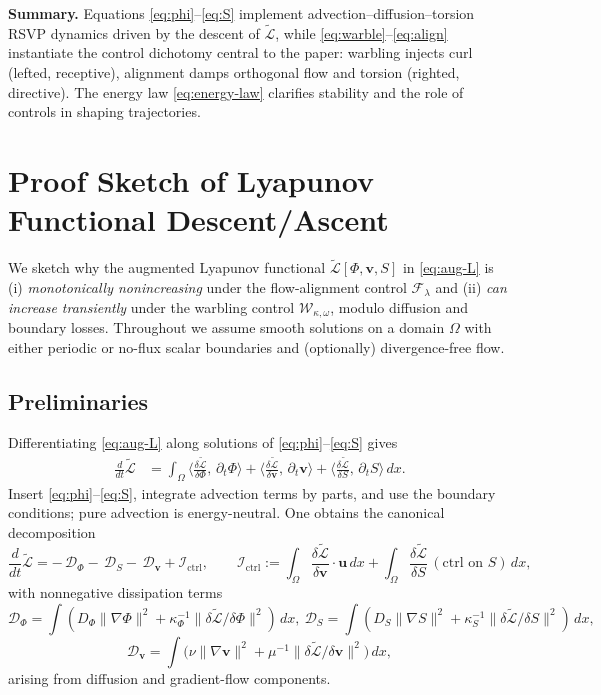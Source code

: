 \documentclass[a4paper,11pt]{article}
\begin{document}
\bigskip
\noindent
\textbf{Summary.} Equations \eqref{eq:phi}–\eqref{eq:S} implement
advection–diffusion–torsion RSVP dynamics driven by the descent of
\(\widetilde{\mathcal{L}}\), while \eqref{eq:warble}–\eqref{eq:align}
instantiate the control dichotomy central to the paper: warbling injects curl
(lefted, receptive), alignment damps orthogonal flow and torsion (righted,
directive). The energy law \eqref{eq:energy-law} clarifies stability and the
role of controls in shaping trajectories.

\section{Proof Sketch of Lyapunov Functional Descent/Ascent}
\label{app:lyapunov-proof}

We sketch why the augmented Lyapunov functional
$\widetilde{\mathcal{L}}[\Phi,\mathbf v,S]$ in \eqref{eq:aug-L} is
(i) \emph{monotonically nonincreasing} under the flow-alignment control
$\mathcal F_\lambda$ and (ii) \emph{can increase transiently} under the
warbling control $\mathcal W_{\kappa,\omega}$, modulo diffusion and boundary
losses. Throughout we assume smooth solutions on a domain $\Omega$ with either
periodic or no-flux scalar boundaries and (optionally) divergence-free flow.

\subsection{Preliminaries}
Differentiating \eqref{eq:aug-L} along solutions of
\eqref{eq:phi}–\eqref{eq:S} gives
\begin{align}
\frac{d}{dt}\widetilde{\mathcal{L}}
&=
\int_\Omega
\Big\langle \frac{\delta\widetilde{\mathcal{L}}}{\delta \Phi},\,\partial_t\Phi\Big\rangle
+\Big\langle \frac{\delta\widetilde{\mathcal{L}}}{\delta \mathbf v},\,\partial_t\mathbf v\Big\rangle
+\Big\langle \frac{\delta\widetilde{\mathcal{L}}}{\delta S},\,\partial_t S\Big\rangle\,dx.
\label{eq:dLdt-master}
\end{align}
Insert \eqref{eq:phi}–\eqref{eq:S}, integrate advection terms by parts, and use
the boundary conditions; pure advection is energy-neutral. One obtains the
canonical decomposition
\begin{equation}
\frac{d}{dt}\widetilde{\mathcal{L}}
=
-\,\mathcal{D}_{\Phi}
-\,\mathcal{D}_{S}
-\,\mathcal{D}_{\mathbf v}
+\mathcal{I}_{\mathrm{ctrl}},
\qquad
\mathcal{I}_{\mathrm{ctrl}}:=\int_\Omega \frac{\delta\widetilde{\mathcal{L}}}{\delta \mathbf v}\cdot \mathbf u \, dx
+ \int_\Omega \frac{\delta\widetilde{\mathcal{L}}}{\delta S}\,(\text{ctrl on }S)\,dx,
\label{eq:dLdt-decomp}
\end{equation}
with nonnegative dissipation terms
\[
\mathcal{D}_{\Phi}\!=\!\int (D_\Phi\|\nabla\Phi\|^2+\kappa_\Phi^{-1}\|\delta\widetilde{\mathcal{L}}/\delta\Phi\|^2)\,dx,\ 
\mathcal{D}_{S}\!=\!\int (D_S\|\nabla S\|^2+\kappa_S^{-1}\|\delta\widetilde{\mathcal{L}}/\delta S\|^2)\,dx,
\]
\[
\mathcal{D}_{\mathbf v}\!=\!\int \Big(\nu\|\nabla\mathbf v\|^2+\mu^{-1}\|\delta\widetilde{\mathcal{L}}/\delta\mathbf v\|^2\Big)\,dx,
\]
arising from diffusion and gradient-flow components.
\end{document}
